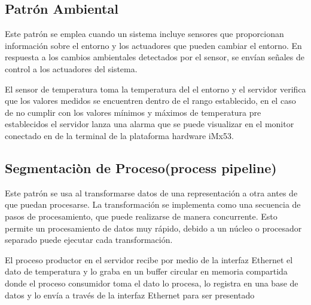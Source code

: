\subsection{\textcolor[gray]{.2}{Patrón Ambiental}}

Este patrón se emplea cuando un sistema incluye sensores que proporcionan información sobre el entorno y los actuadores que pueden cambiar el entorno. En respuesta a los cambios ambientales detectados por el sensor, se envían señales de control a los actuadores del sistema.

El sensor de temperatura toma la temperatura del el entorno y el servidor verifica que los valores medidos se encuentren dentro de el rango establecido, en el caso de no cumplir con los valores mínimos y máximos de temperatura pre establecidos el servidor lanza una alarma que se puede visualizar en el monitor conectado en de la terminal de la plataforma hardware iMx53.

 
\subsection{\textcolor[gray]{.2}{Segmentaciòn de Proceso(process pipeline)}}

Este patrón se usa al transformarse datos de una representación a otra antes de que puedan procesarse. La transformación se implementa como una secuencia de pasos de procesamiento, que puede realizarse de manera concurrente. Esto permite un procesamiento de datos muy rápido, debido a un núcleo o procesador separado puede ejecutar cada transformación.

El proceso productor en el servidor recibe por medio de la interfaz Ethernet el dato de temperatura y lo graba en un buffer circular en memoria compartida donde el proceso consumidor toma el dato lo procesa, lo registra en una base de datos y lo envía a través de la interfaz Ethernet para ser presentado

